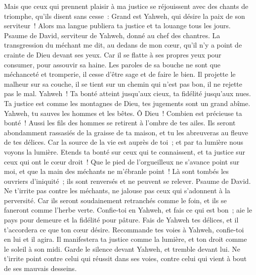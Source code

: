 \begin{multicols}{2}
Mais que ceux qui prennent plaisir à ma justice se réjouissent avec des chants de triomphe, qu'ils disent sans cesse~: Grand est Yahweh, qui désire la paix de son serviteur~!
Alors ma langue publiera ta justice et ta louange tous les jours.
\VerseOne{}Psaume de David, serviteur de Yahweh, donné au chef des chantres.
La transgression du méchant me dit, au dedans de mon cœur, qu'il n'y a point de crainte de Dieu devant ses yeux.
Car il se flatte à ses propres yeux pour consumer, pour assouvir sa haine.
Les paroles de sa bouche ne sont que méchanceté et tromperie, il cesse d'être sage et de faire le bien.
Il projette le malheur sur sa couche, il se tient sur un chemin qui n'est pas bon, il ne rejette pas le mal.
Yahweh~! Ta bonté atteint jusqu'aux cieux, ta fidélité jusqu'aux nues.
Ta justice est comme les montagnes de Dieu, tes jugements sont un grand abîme. Yahweh, tu sauves les hommes et les bêtes.
Ô Dieu~! Combien est précieuse ta bonté~! Aussi les fils des hommes se retirent à l'ombre de tes ailes.
Ils seront abondamment rassasiés de la graisse de ta maison, et tu les abreuveras au fleuve de tes délices.
Car la source de la vie est auprès de toi~; et par ta lumière nous voyons la lumière.
Etends ta bonté sur ceux qui te connaissent, et ta justice sur ceux qui ont le cœur droit~!
Que le pied de l'orgueilleux ne s'avance point sur moi, et que la main des méchants ne m'ébranle point~!
Là sont tombés les ouvriers d'iniquité~; ils sont renversés et ne peuvent se relever.
\VerseOne{}Psaume de David.  Ne t'irrite pas contre les méchants, ne jalouse pas ceux qui s'adonnent à la perversité.
Car ils seront soudainement retranchés comme le foin, et ils se faneront comme l'herbe verte.
 Confie-toi en Yahweh, et fais ce qui est bon~; aie le pays pour demeure et la fidélité pour pâture.
Fais de Yahweh tes délices, et il t'accordera ce que ton cœur désire.
 Recommande tes voies à Yahweh, confie-toi en lui et il agira.
Il manifestera ta justice comme la lumière, et ton droit comme le soleil à son midi.
 Garde le silence devant Yahweh, et tremble devant lui. Ne t'irrite point contre celui qui réussit dans ses voies, contre celui qui vient à bout de ses mauvais desseins.

\end{multicols}
